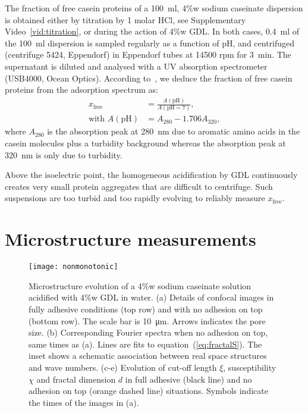 \documentclass[twocolumn,superscriptaddress,showpacs,preprintnumbers,
amsmath,amssymb,prl]{revtex4-1}
\begin{document}
The fraction of free casein proteins of a \SI{100}{\milli\litre}, 4\%w sodium caseinate dispersion is obtained either by titration by 1 molar HCl, see Supplementary Video~\ref{vid:titration}, or during the action of 4\%w GDL. In both cases, \SI{0.4}{\milli\litre} of the \SI{100}{\milli\litre} dispersion is sampled regularly as a function of pH, and centrifuged (centrifuge 5424, Eppendorf) in Eppendorf tubes at 14500 rpm for \SI{3}{\minute}. The supernatant is diluted and analysed with a UV absorption spectrometer (USB4000, Ocean Optics). According to~\cite{Roefs1986}, we deduce the fraction of free casein proteins from the adsorption spectrum as:
%
\begin{align}
x_\text{free} &= \frac{A(\text{pH})}{A(\text{pH}=7)},\\
\text{with }A(\text{pH}) &= A_{280}-1.706 A_{320},
\end{align}
%
where $A_{280}$ is the absorption peak at \SI{280}{\nano\metre} due to aromatic amino acids in the casein molecules plus a turbidity background whereas the absorption peak at \SI{320}{\nano\metre} is only due to turbidity. 

Above the isoelectric point, the homogeneous acidification by GDL continuously creates very small protein aggregates that are difficult to centrifuge. Such suspensions are too turbid and too rapidly evolving to reliably measure $x_\text{free}$.

\section*{Microstructure measurements}

\begin{figure}
	\texttt{[image: nonmonotonic]}%
	\caption{Microstructure evolution of a 4\%w sodium caseinate solution acidified with 4\%w GDL in water. (a) Details of confocal images in fully adhesive conditions (top row) and with no adhesion on top (bottom row). The scale bar is \SI{10}{\micro\metre}. Arrows indicates the pore size. (b) Corresponding Fourier spectra when no adhesion on top, same times as (a). Lines are fits to equation~(\ref{eq:fractalS}). The inset shows a schematic association between real space structures and wave numbers. (c-e) Evolution of cut-off length $\xi$, susceptibility $\chi$ and fractal dimension $d$ in full adhesive (black line) and no adhesion on top (orange dashed line) situations. Symbols indicate the times of the images in (a).}%
	\label{fig:nonmonotonic}%
\end{figure}
\end{document}
